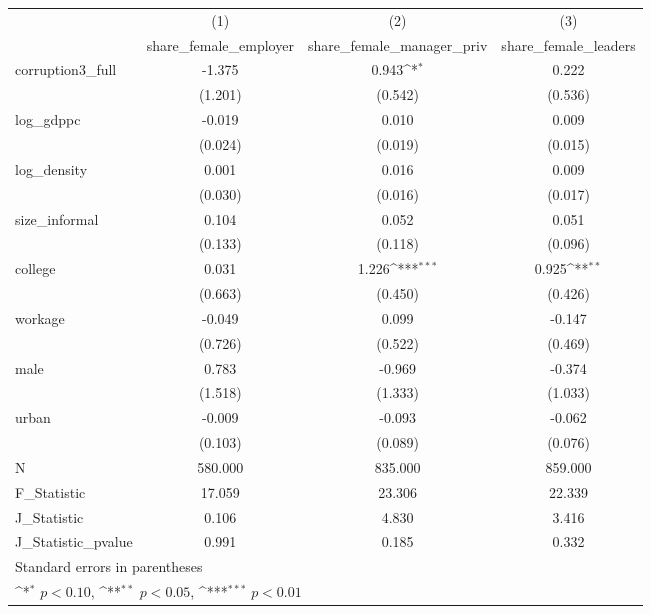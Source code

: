 {
\def\sym#1{\ifmmode^{#1}\else\(^{#1}\)\fi}
\begin{tabular}{l*{3}{c}}
\hline\hline
            &\multicolumn{1}{c}{(1)}&\multicolumn{1}{c}{(2)}&\multicolumn{1}{c}{(3)}\\
            &\multicolumn{1}{c}{share\_female\_employer}&\multicolumn{1}{c}{share\_female\_manager\_priv}&\multicolumn{1}{c}{share\_female\_leaders}\\
\hline
corruption3\_full&      -1.375         &       0.943\sym{*}  &       0.222         \\
            &     (1.201)         &     (0.542)         &     (0.536)         \\
[1em]
log\_gdppc   &      -0.019         &       0.010         &       0.009         \\
            &     (0.024)         &     (0.019)         &     (0.015)         \\
[1em]
log\_density &       0.001         &       0.016         &       0.009         \\
            &     (0.030)         &     (0.016)         &     (0.017)         \\
[1em]
size\_informal&       0.104         &       0.052         &       0.051         \\
            &     (0.133)         &     (0.118)         &     (0.096)         \\
[1em]
college     &       0.031         &       1.226\sym{***}&       0.925\sym{**} \\
            &     (0.663)         &     (0.450)         &     (0.426)         \\
[1em]
workage     &      -0.049         &       0.099         &      -0.147         \\
            &     (0.726)         &     (0.522)         &     (0.469)         \\
[1em]
male        &       0.783         &      -0.969         &      -0.374         \\
            &     (1.518)         &     (1.333)         &     (1.033)         \\
[1em]
urban       &      -0.009         &      -0.093         &      -0.062         \\
            &     (0.103)         &     (0.089)         &     (0.076)         \\
\hline
N           &     580.000         &     835.000         &     859.000         \\
F\_Statistic &      17.059         &      23.306         &      22.339         \\
J\_Statistic &       0.106         &       4.830         &       3.416         \\
J\_Statistic\_pvalue&       0.991         &       0.185         &       0.332         \\
\hline\hline
\multicolumn{4}{l}{\footnotesize Standard errors in parentheses}\\
\multicolumn{4}{l}{\footnotesize \sym{*} \(p<0.10\), \sym{**} \(p<0.05\), \sym{***} \(p<0.01\)}\\
\end{tabular}
}
